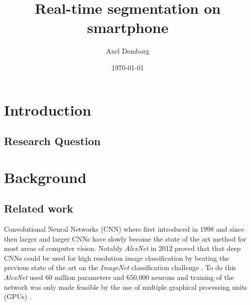 \documentclass{kththesis}
\title{Real-time segmentation on smartphone}
\author{Axel Demborg}
\date{\today}
\newcommand{\bibentry}[1]{\parencite{#1}}
\begin{document}
\frontmatter

\titlepage

\begin{abstract}

\end{abstract}


\begin{otherlanguage}{swedish}
  \begin{abstract}
  \end{abstract}
\end{otherlanguage}


\tableofcontents


\mainmatter


\chapter{Introduction}



\section{Research Question}

\chapter{Background}
\section{Related work}
Convolutional Neural Networks (CNN) where first introduced in 1998 \bibentry{lecun1998gradient} and since then larger and larger CNNs have slowly become the state of the art method for most areas of computer vision. Notably \emph{AlexNet} \bibentry{krizhevsky2012imagenet} in 2012 proved that that deep CNNs could be used for high resolution image classification by beating the previous state of the art \bibentry{sanchez2011high} on the \emph{ImageNet} classification challenge \bibentry{deng2009imagenet}. To do this \emph{AlexNet} used 60 million parameters and 650,000 neurons and training of the network was only made feasible by the use of multiple graphical processing units (GPUs) \bibentry{krizhevsky2012imagenet}. 
\end{document}
